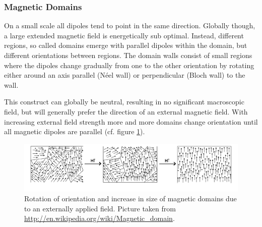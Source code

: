 \documentclass[a4paper]{scrartcl}
\numberwithin{equation}{section}
\numberwithin{figure}{section}
\numberwithin{table}{section}
\begin{document}
\subsubsection*{Magnetic Domains}
On a small scale all dipoles tend to point in the same direction. Globally though, a large extended magnetic field is energetically sub optimal. Instead, different regions, so called domains emerge with parallel dipoles within the domain, but different orientations between regions. The domain walls consist of small regions where the dipoles change gradually from one to the other orientation by rotating either around an axis parallel (N\'{e}el wall) or perpendicular (Bloch wall) to the wall.

This construct can globally be neutral, resulting in no significant macroscopic field, but will generally prefer the direction of an external magnetic field. With increasing external field strength more and more domains change orientation until all magnetic dipoles are parallel (cf. figure \ref{fig:doms}).
\begin{figure}
        \begin{center}
         \includegraphics[width=0.9\linewidth]{img/Dominios.pdf}
        \end{center}
        \caption{
\small Rotation of orientation and increase in size of magnetic domains due to an externally applied field. Picture taken from \url{http://en.wikipedia.org/wiki/Magnetic_domain}.
        }
        \label{fig:doms}
\end{figure}
\end{document}
